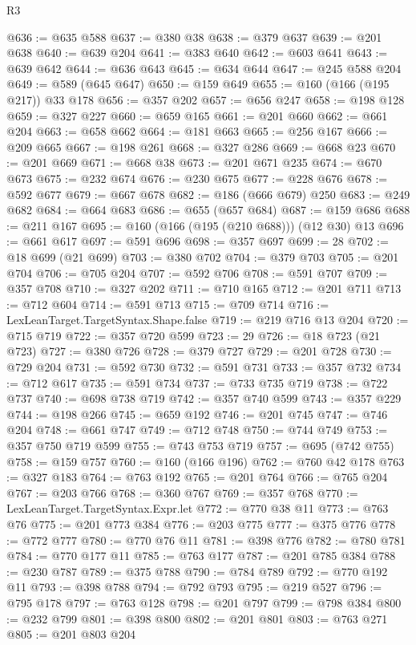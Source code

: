 \begin{lexlean}{R3}
\begin{coremodule}
@636 := @635 @588
@637 := @380 @38
@638 := @379 @637
@639 := @201 @638
@640 := @639 @204
@641 := @383 @640
@642 := @603 @641
@643 := @639 @642
@644 := @636 @643
@645 := @634 @644
@647 := @245 @588 @204
@649 := @589 (@645 @647)
@650 := @159 @649
@655 := @160 (@166 (@195 @217)) @33 @178
@656 := @357 @202
@657 := @656 @247
@658 := @198 @128
@659 := @327 @227
@660 := @659 @165
@661 := @201 @660
@662 := @661 @204
@663 := @658 @662
@664 := @181 @663
@665 := @256 @167
@666 := @209 @665
@667 := @198 @261
@668 := @327 @286
@669 := @668 @23
@670 := @201 @669
@671 := @668 @38
@673 := @201 @671 @235
@674 := @670 @673
@675 := @232 @674
@676 := @230 @675
@677 := @228 @676
@678 := @592 @677
@679 := @667 @678
@682 := @186 (@666 @679) @250
@683 := @249 @682
@684 := @664 @683
@686 := @655 (@657 @684)
@687 := @159 @686
@688 := @211 @167
@695 := @160 (@166 (@195 (@210 @688))) (@12 @30) @13
@696 := @661 @617
@697 := @591 @696
@698 := @357 @697
@699 := 28
@702 := @18 @699 (@21 @699)
@703 := @380 @702
@704 := @379 @703
@705 := @201 @704
@706 := @705 @204
@707 := @592 @706
@708 := @591 @707
@709 := @357 @708
@710 := @327 @202
@711 := @710 @165
@712 := @201 @711
@713 := @712 @604
@714 := @591 @713
@715 := @709 @714
@716 := LexLeanTarget.TargetSyntax.Shape.false
@719 := @219 @716 @13 @204
@720 := @715 @719
@722 := @357 @720 @599
@723 := 29
@726 := @18 @723 (@21 @723)
@727 := @380 @726
@728 := @379 @727
@729 := @201 @728
@730 := @729 @204
@731 := @592 @730
@732 := @591 @731
@733 := @357 @732
@734 := @712 @617
@735 := @591 @734
@737 := @733 @735 @719
@738 := @722 @737
@740 := @698 @738 @719
@742 := @357 @740 @599
@743 := @357 @229
@744 := @198 @266
@745 := @659 @192
@746 := @201 @745
@747 := @746 @204
@748 := @661 @747
@749 := @712 @748
@750 := @744 @749
@753 := @357 @750 @719 @599
@755 := @743 @753 @719
@757 := @695 (@742 @755)
@758 := @159 @757
@760 := @160 (@166 @196)
@762 := @760 @42 @178
@763 := @327 @183
@764 := @763 @192
@765 := @201 @764
@766 := @765 @204
@767 := @203 @766
@768 := @360 @767
@769 := @357 @768
@770 := LexLeanTarget.TargetSyntax.Expr.let
@772 := @770 @38 @11
@773 := @763 @76
@775 := @201 @773 @384
@776 := @203 @775
@777 := @375 @776
@778 := @772 @777
@780 := @770 @76 @11
@781 := @398 @776
@782 := @780 @781
@784 := @770 @177 @11
@785 := @763 @177
@787 := @201 @785 @384
@788 := @230 @787
@789 := @375 @788
@790 := @784 @789
@792 := @770 @192 @11
@793 := @398 @788
@794 := @792 @793
@795 := @219 @527
@796 := @795 @178
@797 := @763 @128
@798 := @201 @797
@799 := @798 @384
@800 := @232 @799
@801 := @398 @800
@802 := @201 @801
@803 := @763 @271
@805 := @201 @803 @204

\end{coremodule}
\end{lexlean}
